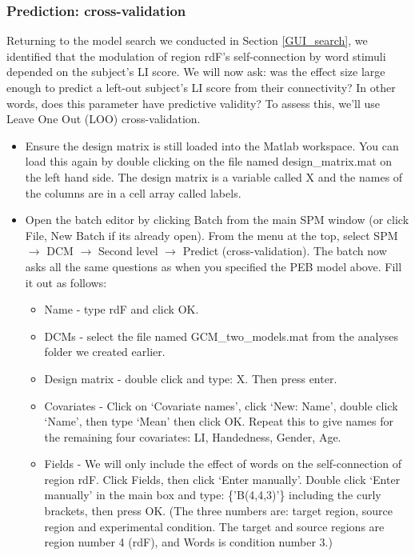 \documentclass{article}
\begin{document}
\subsubsection{Prediction: cross-validation} \label{GUI_LOO}

Returning to the model search we conducted in Section \ref{GUI_search}, we identified that the modulation of region rdF's self-connection by word stimuli depended on the subject's LI score. We will now ask: was the effect size large enough to predict a left-out subject's LI score from their connectivity? In other words, does this parameter have predictive validity? To assess this, we'll use Leave One Out (LOO) cross-validation.

\begin{itemize}
    \item Ensure the design matrix is still loaded into the Matlab workspace. You can load this again by double clicking on the file named design\_matrix.mat on the left hand side. The design matrix is a variable called X and the names of the columns are in a cell array called labels.
    
    \item Open the batch editor by clicking Batch from the main SPM window (or click File, New Batch if its already open). From the menu at the top, select SPM $\rightarrow$ DCM $\rightarrow$ Second level $\rightarrow$ Predict (cross-validation). The batch now asks all the same questions as when you specified the PEB model above. Fill it out as follows:
    \begin{itemize}
        \item Name - type rdF and click OK.
        
        \item DCMs - select the file named GCM\_two\_models.mat from the analyses folder we created earlier.
        
        \item Design matrix - double click and type: X. Then press enter.
        
        \item Covariates - Click on `Covariate names', click `New: Name', double click `Name', then type `Mean' then click OK.  Repeat this to give names for the remaining four covariates: LI, Handedness, Gender, Age.
        
        \item Fields - We will only include the effect of words on the self-connection of region rdF. Click Fields, then click `Enter manually'. Double click `Enter manually' in the main box and type: \{{'B(4,4,3)'}\} including the curly brackets, then press OK. (The three numbers are: target region, source region and experimental condition. The target and source regions are region number 4 (rdF), and Words is condition number 3.)
        

\end{itemize}
\end{itemize}
\end{document}

